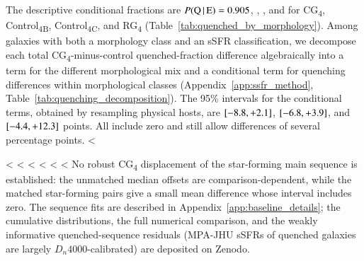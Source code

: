 \documentclass{aa}
\newcommand{\CB}{Control\textsubscript{4B}}
\newcommand{\CC}{Control\textsubscript{4C}}
\newcommand{\CG}{CG\textsubscript{4}}
\newcommand{\RG}{RG\textsubscript{4}}
\begin{document}
The descriptive conditional fractions are \(P(\mathrm{Q}\,|\,\mathrm{E}) = 0.905\), \qEcb, \qEcc, and \qErg{} for \CG{}, \CB{}, \CC{}, and \RG{} (Table~\ref{tab:quenched_by_morphology}). Among galaxies with both a morphology class and an sSFR classification, we decompose each total \CG{}-minus-control quenched-fraction difference algebraically \citep{Kitagawa1955} into a term for the different morphological mix and a conditional term for quenching differences within morphological classes (Appendix~\ref{app:ssfr_method}, Table~\ref{tab:quenching_decomposition}). The 95\% intervals for the conditional terms, obtained by resampling physical hosts, are \([-8.8, +2.1]\), \([-6.8, +3.9]\), and \([-4.4, +12.3]\) points. All include zero and still allow differences of several percentage points. <%

<%
<%
<%
<%
<%
<%
No robust \CG{} displacement of the star-forming main sequence is established: the unmatched median offsets are comparison-dependent, while the matched star-forming pairs give a small mean difference whose interval includes zero. The sequence fits are described in Appendix~\ref{app:baseline_details}; the cumulative distributions, the full numerical comparison, and the weakly informative quenched-sequence residuals (MPA-JHU sSFRs of quenched galaxies are largely \(D_n4000\)-calibrated) are deposited on Zenodo.
\end{document}

